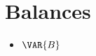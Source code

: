 \documentclass{article}
\begin{document}
\section{}
\section{Balances}
\begin{itemize}
    \item $\VAR{B}$
\end{itemize}
\end{document}
